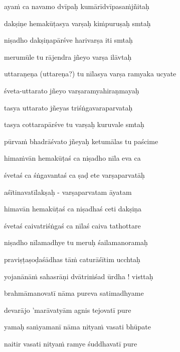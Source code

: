 aya\.m ca navamo dvīpaḥ kumārīdvīpasa\.mjñitaḥ\thinspace{\dandab} \dontdisplaylinenum

dakṣiṇe hemakūṭasya varṣaḥ ki\.mpuruṣaḥ smtaḥ \veg\dontdisplaylinenum

niṣadho dakṣiṇapārśve harivarṣa iti smtaḥ\thinspace{\dandab} \dontdisplaylinenum

merumūle tu rājendra jñeyo varṣa ilāvtaḥ \veg\dontdisplaylinenum

uttaraṇeṇa (uttareṇa?) tu nīlasya varṣa ramyaka ucyate\thinspace{\dandab} \dontdisplaylinenum

śveta-uttarato jñeyo varṣaramyahiraṇmayaḥ \veg\dontdisplaylinenum

tasya uttarato jñeyas triśṅgavaraparvataḥ\thinspace{\dandab} \dontdisplaylinenum

tasya cottarapārśve tu varṣaḥ kuruvale smtaḥ \veg\dontdisplaylinenum

pūrva\.m bhadrāśvato jñeyaḥ ketumālas tu paścime\thinspace{\dandab} \dontdisplaylinenum

hima\.mvān hemakūṭaś ca niṣadho nīla eva ca \veg\dontdisplaylinenum

śvetaś ca śṅgavantaś ca ṣaḍ ete varṣaparvatāḥ\thinspace{\dandab} \dontdisplaylinenum

aśītinavatīlakṣaḥ - varṣaparvatam āyatam \veg\dontdisplaylinenum

himavān hemakūṭaś ca niṣadhaś ceti dakṣiṇa\thinspace{\dandab} \dontdisplaylinenum

śvetaś caivatriśṅgaś ca nīlaś caiva tathottare \veg\dontdisplaylinenum

niṣadho nīlamadhye tu meruḥ śailamanoramaḥ\thinspace{\dandab} \dontdisplaylinenum

praviṣṭaṣoḍaśādhas tā\.m caturāśītim ucchtaḥ \veg\dontdisplaylinenum

yojanānā\.m sahasrāṇi dvātri\.mśad ūrdha ! visttaḥ\thinspace{\dandab} \dontdisplaylinenum

brahmāmanovatī nāma pureva satimadhyame \veg\dontdisplaylinenum

devarājo 'marāvatyām agnis tejovatī pure \veg\dontdisplaylinenum

yamaḥ sa\.myamanī nāma nitya\.m vasati bhūpate\thinspace{\dandab} \dontdisplaylinenum

naitir vasati nitya\.m ramye śuddhavatī pure \veg\dontdisplaylinenum

